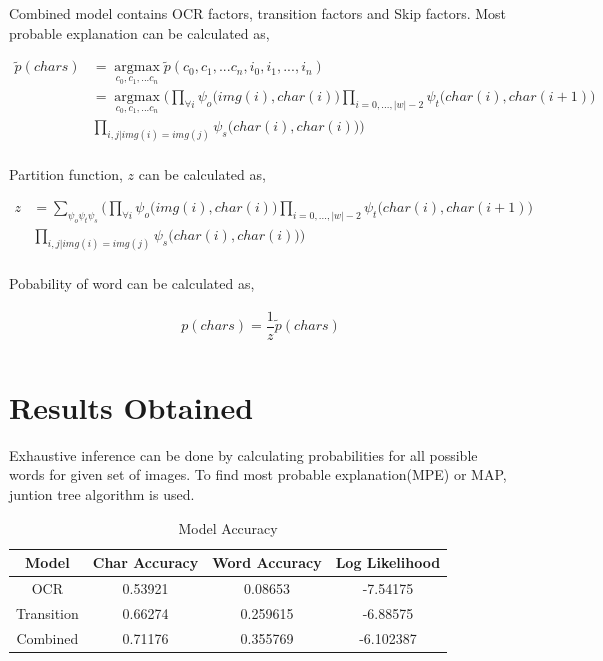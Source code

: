 \documentclass[paper=a4, fontsize=11pt]{scrartcl} %
\DeclareMathOperator*{\argmax}{argmax}
\newcommand*{\argmaxl}{\argmax\limits}
\numberwithin{equation}{section} %
\numberwithin{figure}{section} %
\numberwithin{table}{section} %
\begin{document}
Combined model contains OCR factors, transition factors and Skip factors. Most probable explanation can be calculated as,

\begin{align*}
	\tilde{p}(chars) & = \argmaxl_{c_0,c_1,...c_n} \tilde{p}(c_0,c_1,...c_n,i_0,i_1,...,i_n) \\
					 & = \argmaxl_{c_0,c_1,...c_n} \bigg( \displaystyle \prod_{\forall i}^{}  \psi_{o}\big(img(i),char(i)\big) \displaystyle \prod_{i=0,...,|w|-2}^{}  \psi_{t}\big(char(i),char(i+1)\big) \\ & \displaystyle \prod_{i,j|img(i)=img(j)}^{} \psi_{s}\big(char(i),char(i)\big) \bigg)\\
\end{align*}

Partition function, $z$ can be calculated as,

\begin{align*}
	z & = \displaystyle \sum_{\psi_{o} \psi_{t} \psi_{s}}^{} \bigg( \displaystyle \prod_{\forall i}^{}  \psi_{o}\big(img(i),char(i)\big) \displaystyle \prod_{i=0,...,|w|-2}^{}  \psi_{t}\big(char(i),char(i+1)\big) \\ & \displaystyle \prod_{i,j|img(i)=img(j)}^{} \psi_{s}\big(char(i),char(i)\big) \bigg)\\
\end{align*}

Pobability of word can be calculated as,

\begin{align*}
	p(chars) = \dfrac{1}{z} \tilde{p}(chars) \\
\end{align*}

\section{Results Obtained}

Exhaustive inference can be done by calculating probabilities for all possible words for given set of images. To find most probable explanation(MPE) or MAP, juntion tree algorithm is used. 

\begin{table}[h!]
  \begin{center}
    \begin{tabular}{||c c c c||} 
    \hline
      Model & Char Accuracy & Word Accuracy & Log Likelihood \\ [0.5ex] 
    \hline\hline
      OCR &  0.53921 & 0.08653 & -7.54175 \\ 
    \hline
      Transition & 0.66274 & 0.259615 & -6.88575 \\
    \hline
      Combined &  0.71176 & 0.355769 & -6.102387 \\
    \hline
    \end{tabular}
    \caption{Model Accuracy} \label{table:1}
  \end{center}
\end{table}
\end{document}
